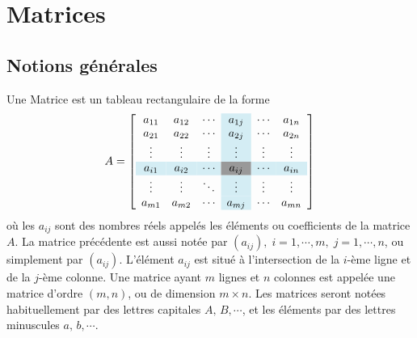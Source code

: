 \documentclass[12pt,a4paper]{book}
\numberwithin{definition}{chapter}
\theoremstyle{plain}
\begin{document}
	\thispagestyle{empty}
	\chapter{Matrices}
	\section{Notions générales}
	\begin{definition}
		Une Matrice est un tableau rectangulaire de la forme
		\begin{equation*}
			A = 
			\left[
			\begin{array}{ccc>{\columncolor{clight2}}c cc} 
				a_{11} & a_{12} & \cdots &  a_{1j} & \cdots & a_{1n}\\ 
				a_{21} & a_{22} & \cdots &  a_{2j} & \cdots & a_{2n}\\ 
				\vdots & \vdots &\vdots & \vdots & \vdots&\vdots \\
				\rowcolor{clight2} a_{i1} & a_{i2} & \cdots & \cellcolor[gray]{.6}a_{ij} & \cdots & a_{in}\\
				\vdots & \vdots &\ddots & \vdots & \vdots &\vdots \\
				a_{m1} & a_{m2} & \cdots & a_{mj} & \cdots & a_{mn}
			\end{array}
			\right]
		\end{equation*}
		où les $a_{ij}$ sont des nombres réels appelés les éléments ou coefficients de la matrice $A$. La matrice précédente est aussi notée par $\left(a_{ij}\right),\;i=1,\cdots,m,\;j=1,\cdots,n$, ou simplement par $\left(a_{ij}\right)$. L'élément $a_{ij}$ est situé à l’intersection de la $i$-ème ligne et de la $j$-ème colonne. Une matrice ayant $m$ lignes et $n$ colonnes
		est appelée une matrice d'ordre $(m,n)$, ou de dimension $m\times n$. Les matrices seront notées habituellement par des lettres capitales $A,\,B,\cdots$, et les éléments par des lettres minuscules $a,\,b,\cdots$.
	\end{definition}
\end{document}
